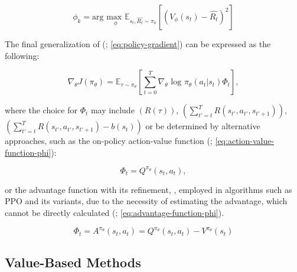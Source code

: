 \begin{equation}
    \phi_k = \text{arg }\underset{\phi}{\text{max }} \mathbb{E}_{s_t, \hat{R_t} \sim \pi_k} \left [ \left (  V_{\phi}(s_t) - \hat{R_t}    \right )^{2} \right]
    \label{eq:mean-squared-error}
\end{equation}

\noindent The final generalization of (\textcolor{deepblue}{\cite{SpinningUp2018}; \autoref{eq:policy-gradient}}) can be expressed as the following:

\begin{equation}
    \nabla_{\theta}J(\pi_{\theta}) = \mathbb{E}_{\tau \sim \pi_{\theta}} \left[ \sum_{t=0}^{T} \nabla_{\theta} \text{ log } \pi_{\theta}(a_t | s_t) \Phi_t \right], 
    \label{eq:policy-gradient-general}
\end{equation}

\noindent where the choice for $\Phi_t$ may include  $\left(R(\tau)\right)$,  $\left(\sum_{t'= t}^{T} R(s_{t'}, a_{t'}, s_{t'+1})\right)$,  $\left(\sum_{t'= t}^{T} R(s_{t'}, a_{t'}, s_{t'+1}) - b(s_t)\right)$ or be determined by alternative approaches, such as the on-policy action-value function (\textcolor{deepblue}{\cite{SpinningUp2018}; \autoref{eq:action-value-function-phi}}):

\begin{equation}
    \Phi_t = Q^{\pi_{\theta}} (s_t, a_t),
    \label{eq:action-value-function-phi}
\end{equation}

\noindent or the advantage function with its refinement, , employed in algorithms such as PPO and its variants, due to the necessity of estimating the advantage, which cannot be directly calculated (\textcolor{deepblue}{\cite{SpinningUp2018}; \autoref{eq:advantage-function-phi}}).

\begin{equation}
    \Phi_t = A^{\pi_{\theta}} (s_t, a_t) = Q^{\pi_{\theta}} (s_t, a_t) - V^{\pi_{\theta}} (s_t)
    \label{eq:advantage-function-phi}
\end{equation}

\subsection{Value-Based Methods}

